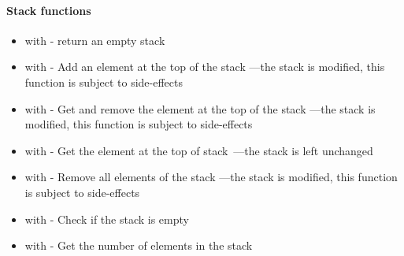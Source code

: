 \paragraph{Stack functions}

\begin{itemize}
	\item {} with  - return an empty stack
	\item \label{item:lbl-stack_push}  with  - Add an element  at the top of the stack ---the stack is modified, this function is subject to side-effects
	\item \label{item:lbl-stack_pop}  with  - Get and remove the element at the top of the stack ---the stack is modified, this function is subject to side-effects
	\item \label{item:lbl-stack_top}  with  - Get the element at the top of stack~---the stack is left unchanged
	\item \label{item:lbl-stack_clear}  with  - Remove all elements of the stack ---the stack is modified, this function is subject to side-effects
	\item \label{item:lbl-stack_is_empty}  with  - Check if the stack  is empty
	\item \label{item:lbl-stack_length}  with  - Get the number of elements in the stack 
\end{itemize}


